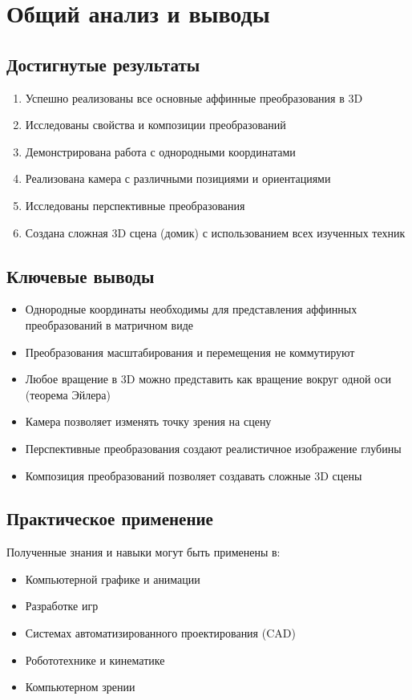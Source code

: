 \section*{Общий анализ и выводы}

\subsection*{Достигнутые результаты}
\begin{enumerate}
    \item Успешно реализованы все основные аффинные преобразования в 3D
    \item Исследованы свойства и композиции преобразований
    \item Демонстрирована работа с однородными координатами
    \item Реализована камера с различными позициями и ориентациями
    \item Исследованы перспективные преобразования
    \item Создана сложная 3D сцена (домик) с использованием всех изученных техник
\end{enumerate}

\subsection*{Ключевые выводы}
\begin{itemize}
    \item Однородные координаты необходимы для представления аффинных преобразований в матричном виде
    \item Преобразования масштабирования и перемещения не коммутируют
    \item Любое вращение в 3D можно представить как вращение вокруг одной оси (теорема Эйлера)
    \item Камера позволяет изменять точку зрения на сцену
    \item Перспективные преобразования создают реалистичное изображение глубины
    \item Композиция преобразований позволяет создавать сложные 3D сцены
\end{itemize}

\subsection*{Практическое применение}
Полученные знания и навыки могут быть применены в:
\begin{itemize}
    \item Компьютерной графике и анимации
    \item Разработке игр
    \item Системах автоматизированного проектирования (CAD)
    \item Робототехнике и кинематике
    \item Компьютерном зрении
\end{itemize}

